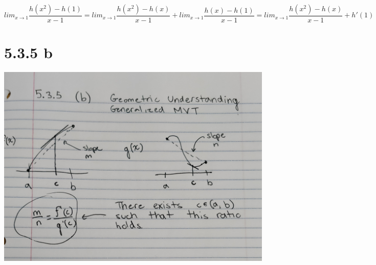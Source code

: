 \documentclass{article}
\begin{document}
\[ lim_{x \rightarrow 1} \frac{h(x^2) - h (1)}{x-1} = lim_{x \rightarrow 1} \frac{h(x^2) - h (x)}{x-1}  + lim_{x \rightarrow 1} \frac{h(x) - h(1)}{x-1} = lim_{x \rightarrow 1} \frac{h(x^2) - h (x)}{x-1} + h'(1) \]

\section*{5.3.5 b}
\includegraphics[scale=0.1]{pic.jpg}
\end{document}
